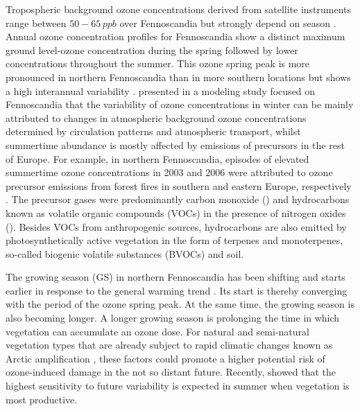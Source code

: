 \documentclass[bg, manuscript]{copernicus}
\begin{document}
Tropospheric background ozone concentrations derived from satellite instruments range between $50-65\,\unit{ppb}$ over Fennoscandia but strongly depend on season \citep{ESA:Cooper2014}. Annual ozone concentration profiles for Fennoscandia show a distinct maximum ground level-ozone concentration during the spring followed by lower concentrations throughout the summer. This ozone spring peak is more pronounced in northern Fennoscandia than in more southern locations but shows a high interannual variability \citep{AB:Klingberg2009, BER:Klingberg2019}. \citet{ACP:Andersson2017} presented in a modeling study focused on Fennoscandia that the variability of ozone concentrations in winter can be mainly attributed to changes in atmospheric background ozone concentrations determined by circulation patterns and atmospheric transport, whilst summertime abundance is mostly affected by emissions of precursors in the rest of Europe. For example, in northern Fennoscandia, episodes of elevated summertime ozone concentrations in 2003 and 2006 were attributed to ozone precursor emissions from forest fires in southern and eastern Europe, respectively \citep{AE:Lindskog2007,EP:Karlsson2013}. The precursor gases were predominantly carbon monoxide () and hydrocarbons known as volatile organic compounds (VOCs) in the presence of nitrogen oxides (). Besides VOCs from anthropogenic sources, hydrocarbons are also emitted by photosynthetically active vegetation in the form of terpenes and monoterpenes, so-called biogenic volatile substances (BVOCs) and soil.

The growing season (GS) in northern Fennoscandia has been shifting and starts earlier in response to the general warming trend \citep[e.g.,][]{GCB:Menzel2006,RS:Hogda2013,IJB:Karlsen2007}. Its start is thereby converging with the period of the ozone spring peak. At the same time, the growing season is also becoming longer. A longer growing season is prolonging the time in which vegetation can accumulate an ozone dose. For natural and semi-natural vegetation types that are already subject to rapid climatic changes known as Arctic amplification \citep{AMAP2012,IPCC2013}, these factors could promote a higher potential risk of ozone-induced damage in the not so distant future. Recently, \citet{ESPR:Hayes2021} showed that the highest sensitivity to future \chem{[O_3]} variability is expected in summer when vegetation is most productive.
\end{document}
